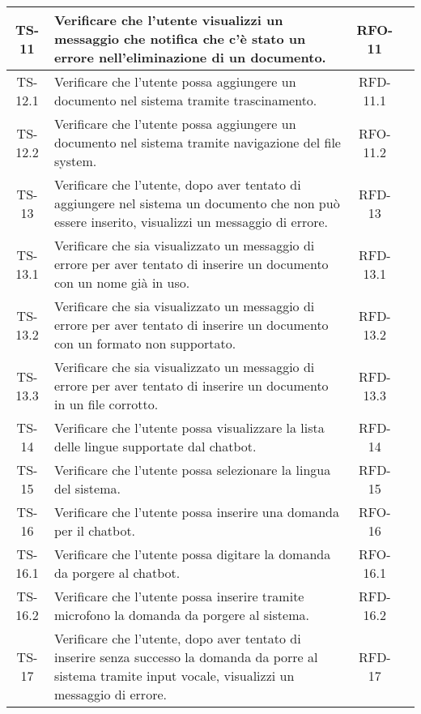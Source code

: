 \begin{xltabular}{\textwidth}{| c | X | c | c |}
    \hline
    TS-11 & Verificare che l'utente visualizzi un messaggio che notifica che c'è stato un errore nell'eliminazione di un documento. & RFO-11 & \textcolor{xmarkcolor}{} \\
    \hline
    TS-12.1 & Verificare che l’utente possa aggiungere un documento nel sistema tramite trascinamento. & RFD-11.1 & \textcolor{xmarkcolor}{} \\
    \hline
    TS-12.2 & Verificare che l’utente possa aggiungere un documento nel sistema tramite navigazione del file system. & RFO-11.2 & \textcolor{xmarkcolor}{} \\
    \hline
    TS-13 & Verificare che l’utente, dopo aver tentato di aggiungere nel sistema un documento che non può essere inserito, visualizzi un messaggio di errore. & RFD-13 & \textcolor{xmarkcolor}{} \\
    \hline
    TS-13.1 & Verificare che sia visualizzato un messaggio di errore per aver tentato di inserire un documento con un nome già in uso. & RFD-13.1 & \textcolor{xmarkcolor}{} \\
    \hline
    TS-13.2 & Verificare che sia visualizzato un messaggio di errore per aver tentato di inserire un documento con un formato non supportato. & RFD-13.2 & \textcolor{xmarkcolor}{} \\
    \hline
    TS-13.3 & Verificare che sia visualizzato un messaggio di errore per aver tentato di inserire un documento in un file corrotto. & RFD-13.3 & \textcolor{xmarkcolor}{} \\
    \hline
    TS-14 & Verificare che l’utente possa visualizzare la lista delle lingue supportate dal chatbot. & RFD-14 & \textcolor{xmarkcolor}{} \\
    \hline
    TS-15 & Verificare che l’utente possa selezionare la lingua del sistema. & RFD-15 & \textcolor{xmarkcolor}{} \\
    \hline
    TS-16 & Verificare che l’utente possa inserire una domanda per il chatbot. & RFO-16 & \textcolor{xmarkcolor}{} \\
    \hline
    TS-16.1 & Verificare che l'utente possa digitare la domanda da porgere al chatbot. & RFO-16.1 & \textcolor{xmarkcolor}{} \\
    \hline
    TS-16.2 & Verificare che l'utente possa inserire tramite microfono la domanda da porgere al sistema. & RFD-16.2 & \textcolor{xmarkcolor}{} \\
    \hline
    TS-17 & Verificare che l’utente, dopo aver tentato di inserire senza successo la domanda da porre al sistema tramite input vocale, visualizzi un messaggio di errore. & RFD-17 & \textcolor{xmarkcolor}{} \\

\end{xltabular}
